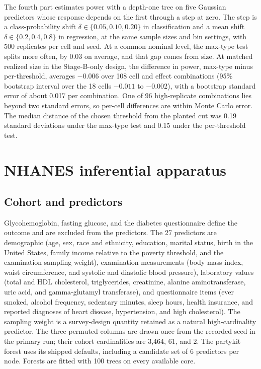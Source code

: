 \documentclass[11pt]{article}
\newcommand{\pkg}[1]{{\normalfont\fontseries{b}\selectfont #1}}
\begin{document}
The fourth part estimates power with a depth-one tree on five Gaussian
predictors whose response depends on the first through a step at zero. The
step is a class-probability shift $\delta \in \{0.05, 0.10, 0.20\}$ in
classification and a mean shift $\delta \in \{0.2, 0.4, 0.8\}$ in regression,
at the same sample sizes and bin settings, with 500 replicates per cell and
seed. At a common nominal level, the max-type test splits more often, by 0.03
on average, and that gap comes from size. At matched realized size in the
Stage-B-only design, the difference in power, max-type minus per-threshold,
averages $-0.006$ over 108 cell and effect combinations (95\% bootstrap
interval over the 18 cells $-0.011$ to $-0.002$), with a bootstrap standard
error of about 0.017 per combination. One of 96 high-replicate combinations
lies beyond two standard errors, so per-cell differences are within Monte
Carlo error. The median distance of the chosen threshold from the planted cut
was 0.19 standard deviations under the max-type test and 0.15 under the
per-threshold test.

\section{NHANES inferential apparatus} \label{sec:nhanes-apparatus}

\subsection{Cohort and predictors}

Glycohemoglobin, fasting glucose, and the diabetes questionnaire define the
outcome and are excluded from the predictors. The 27 predictors are
demographic (age, sex, race and ethnicity, education, marital status, birth
in the United States, family income relative to the poverty threshold, and
the examination sampling weight), examination measurements (body mass index,
waist circumference, and systolic and diastolic blood pressure), laboratory
values (total and HDL cholesterol, triglycerides, creatinine, alanine
aminotransferase, uric acid, and gamma-glutamyl transferase), and
questionnaire items (ever smoked, alcohol frequency, sedentary minutes, sleep
hours, health insurance, and reported diagnoses of heart disease,
hypertension, and high cholesterol). The sampling weight is a survey-design
quantity retained as a natural high-cardinality predictor. The three permuted
columns are drawn once from the recorded seed in the primary run; their
cohort cardinalities are 3,464, 61, and 2. The \pkg{partykit} forest uses its
shipped defaults, including a candidate set of 6 predictors per node. Forests
are fitted with 100 trees on every available core.
\end{document}
